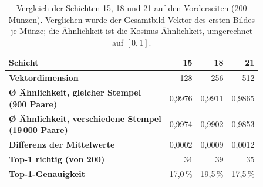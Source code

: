 \begin{table}[H]
\centering
\small
\caption{Vergleich der Schichten 15, 18 und 21 auf den Vorderseiten (200 Münzen). Verglichen wurde der Gesamtbild-Vektor des ersten Bildes je Münze; die Ähnlichkeit ist die Kosinus-Ähnlichkeit, umgerechnet auf $[0,1]$.}
\label{tab:schichten-gesamtb-obverse}
\begin{tabular}{|l|r|r|r|}
\hline
\textbf{Schicht}                         & \textbf{15} & \textbf{18} & \textbf{21} \\ \hline
\hline
\textbf{Vektordimension}                          & 128         & 256         & 512         \\ \hline
\makecell[l]{\textbf{Ø Ähnlichkeit, gleicher Stempel} \\ \textbf{(900 Paare)}}  & 0{,}9976    & 0{,}9911    & 0{,}9865    \\ \hline
\makecell[l]{\textbf{Ø Ähnlichkeit, verschiedene Stempel} \\ \textbf{(19\,000 Paare)}} & 0{,}9974 & 0{,}9902 & 0{,}9853   \\ \hline
\textbf{Differenz der Mittelwerte}                & 0{,}0002    & 0{,}0009    & 0{,}0012    \\ \hline
\textbf{Top-1 richtig (von 200)}                  & 34          & 39          & 35          \\ \hline
\textbf{Top-1-Genauigkeit}                        & 17{,}0\,\%  & 19{,}5\,\%  & 17{,}5\,\%  \\ \hline
\end{tabular}
\end{table}

